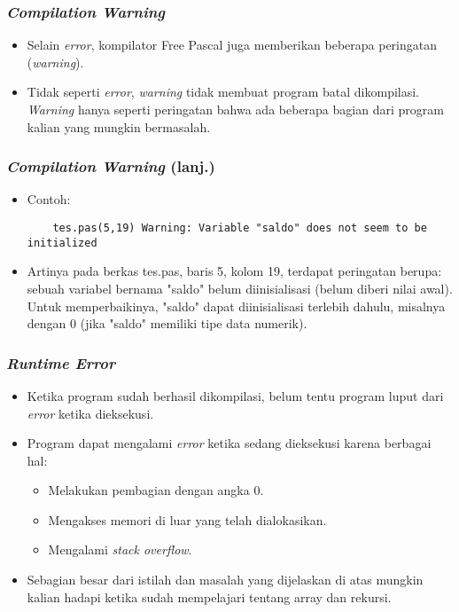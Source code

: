\begin{frame}[fragile]
\frametitle{\textit{Compilation Warning}}
\begin{itemize}
  \item Selain \textit{error}, kompilator Free Pascal juga memberikan beberapa peringatan (\textit{warning}).
  \item Tidak seperti \textit{error}, \textit{warning} tidak membuat program batal dikompilasi. \textit{Warning} hanya seperti peringatan bahwa ada beberapa bagian dari program kalian yang mungkin bermasalah. 
\end{itemize}
\end{frame}

\begin{frame}[fragile]
\frametitle{\textit{Compilation Warning} (lanj.)}
\begin{itemize}
  \item Contoh:
  \begin{lstlisting}
    tes.pas(5,19) Warning: Variable "saldo" does not seem to be initialized
  \end{lstlisting}
  \item Artinya pada berkas tes.pas, baris 5, kolom 19, terdapat peringatan berupa: sebuah variabel bernama "saldo" belum diinisialisasi (belum diberi nilai awal). Untuk memperbaikinya, "saldo" dapat diinisialisasi terlebih dahulu, misalnya dengan 0 (jika "saldo" memiliki tipe data numerik).
\end{itemize}
\end{frame}

\begin{frame}
\frametitle{\textit{Runtime Error}}
\begin{itemize}
  \item Ketika program sudah berhasil dikompilasi, belum tentu program luput dari \textit{error} ketika dieksekusi.
  \item Program dapat mengalami \textit{error} ketika sedang dieksekusi karena berbagai hal:
  \begin{itemize}
    \item Melakukan pembagian dengan angka 0.
    \item Mengakses memori di luar yang telah dialokasikan.
    \item Mengalami \textit{stack overflow}.
  \end{itemize}
  \item Sebagian besar dari istilah dan masalah yang dijelaskan di atas mungkin kalian hadapi ketika sudah mempelajari tentang array dan rekursi.
\end{itemize}
\end{frame}

